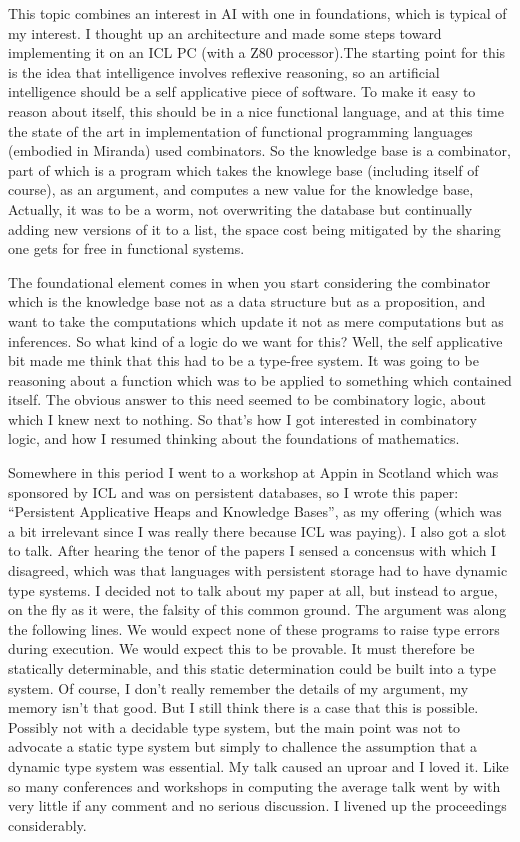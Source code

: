 \documentclass{rbjk}
\begin{document}
\begin{article}
This topic combines an interest in AI with one in foundations, which is typical of my interest.
I thought up an architecture and made some steps toward implementing it on an ICL PC (with a Z80 processor).The starting point for this is the idea that intelligence involves reflexive reasoning, so an artificial intelligence should be a self applicative piece of software.
To make it easy to reason about itself, this should be in a nice functional language, and at this time the state of the art in implementation of functional programming languages (embodied in Miranda) used combinators.
So the knowledge base is a combinator, part of which is a program which takes the knowlege base (including itself of course), as an argument, and computes a new value for the knowledge base,
Actually, it was to be a worm, not overwriting the database but continually adding new versions of it to a list, the space cost being mitigated by the sharing one gets for free in functional systems.

The foundational element comes in when you start considering the combinator which is the knowledge base not as a data structure but as a proposition, and want to take the computations which update it not as mere computations but as inferences.
So what kind of a logic do we want for this?
Well, the self applicative bit made me think that this had to be a type-free system.
It was going to be reasoning about a function which was to be applied to something which contained itself.
The obvious answer to this need seemed to be combinatory logic, about which I knew next to nothing.
So that's how I got interested in combinatory logic, and how I resumed thinking about the foundations of mathematics.

Somewhere in this period I went to a workshop at Appin in Scotland which was sponsored by ICL and was on persistent databases, so I wrote this paper:
``Persistent Applicative Heaps and Knowledge Bases'', as my offering (which was a bit irrelevant since I was really there because ICL was paying).
I also got a slot to talk.
After hearing the tenor of the papers I sensed a concensus with which I disagreed, which was that languages with persistent storage had to have dynamic type systems.
I decided not to talk about my paper at all, but instead to argue, on the fly as it were, the falsity of this common ground.
The argument was along the following lines.
We would expect none of these programs to raise type errors during execution.
We would expect this to be provable.
It must therefore be statically determinable, and this static determination could be built into a type system.
Of course, I don't really remember the details of my argument, my memory isn't that good.
But I still think there is a case that this is possible.
Possibly not with a decidable type system, but the main point was not to advocate a static type system but simply to challence the assumption that a dynamic type system was essential.
My talk caused an uproar and I loved it.
Like so many conferences and workshops in computing the average talk went by with very little if any comment and no serious discussion.
I livened up the proceedings considerably.


\end{article}
\end{document}
